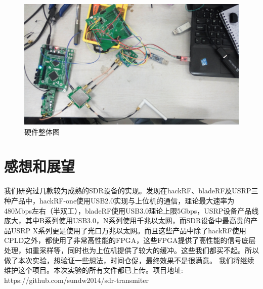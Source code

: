 \documentclass[UTF8,titlepage]{ctexart}
\begin{document}
\begin{figure}[H]
\centering
\includegraphics[width = .9\textwidth]{fullStuff.eps}
\caption{硬件整体图}
\label{fig:fullStuff}
\end{figure}

\section*{感想和展望}
我们研究过几款较为成熟的SDR设备的实现。发现在hackRF、bladeRF及USRP三种产品中，hackRF-one使用USB2.0实现与上位机的通信，理论最大速率为480Mbps左右（半双工），bladeRF使用USB3.0理论上限5Gbps，USRP设备产品线庞大，其中B系列使用USB3.0，N系列使用千兆以太网，而SDR设备中最高贵的产品USRP X系列更是使用了光口万兆以太网。而且这些产品中除了hackRF使用CPLD之外，都使用了非常高性能的FPGA，这些FPGA提供了高性能的信号底层处理，如重采样等，同时也为上位机提供了较大的缓冲。这些我们都买不起。所以做了本次实验，想验证一些想法，时间仓促，最终效果不是很满意。
我们将继续维护这个项目。本次实验的所有文件都已上传。项目地址: https://github.com/sundw2014/sdr-transmiter

\newpage
\renewcommand\refname{Reference}


\end{document}
